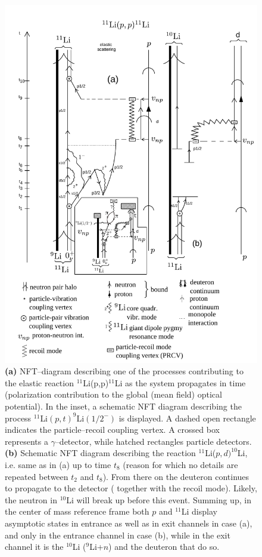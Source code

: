      \begin{figure}
     \centerline {
     \includegraphics*[width=13cm]{introduccion/figs/fig1_9_2xx}
     }
     \caption{{\bf (a)}  NFT--diagram describing  one of the processes contributing to the elastic reaction $^{11}$Li(p,p)$^{11}$Li as the system propagates in time
         	    	(polarization contribution to the global  (mean field) optical potential).  In the inset, a schematic NFT diagram describing the process $^{11}$Li$(p,t)^{9}$Li$(1/2^-)$ is displayed. A dashed open rectangle indicates the particle--recoil coupling vertex. A crossed box represents a $\gamma$--detector, while hatched rectangles particle detectors. 
         	    	 {\bf (b)} Schematic NFT diagram describing the reaction $^{11}$Li($p,d)^{10}$Li, i.e. same as in (a)  up to time $t_8$ (reason for which no  details are repeated between $t_2$ and $t_8$). From there on  the deuteron continues  to propagate  to the detector ( together with the recoil mode). Likely,  the neutron in $^{10}$Li will break up before  this event. 
         	    	 Summing up, in the center of mass reference frame both $p$ and $^{11}$Li display asymptotic states in entrance as well as in exit channels in case (a), and only in the entrance channel in case (b), while in the exit channel it is the $^{10}$Li ($^9$Li+$n$) and the deuteron that do so.}
     \label{fig1.9.2}
     \end{figure}
